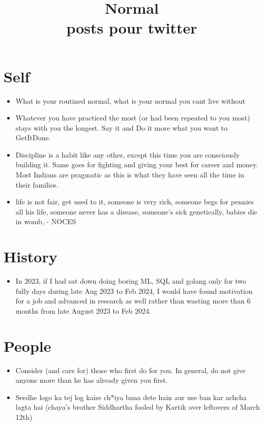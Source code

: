 \documentclass{article}
\title {\large {\textbf {Normal}} \\ \small {posts pour twitter}}
\begin{document}
\maketitle

\section {Self}
\begin{itemize}
\item What is your routined normal, what is your normal you cant live without
\item Whatever you have practiced the most (or had been repeated to you most) stays with you the longest. Say it and Do it more what you want to GetItDone.
\item Discipline is a habit like any other, except this time you are consciously building it. Same goes for fighting and giving your best for career and money. Most Indians are pragmatic as this is what they have seen all the time in their families.
\item life is not fair, get used to it, someone is very rich, someone begs for pennies all his life, someone never has a disease, someone's sick genetically, babies die in womb, - NOCES 

\end{itemize}

\section {History}
\begin{itemize}
\item In 2023, if I had sat down doing boring ML, SQL and golang only for two fully days during late Aug 2023 to Feb 2024, I would have found motivation for a job and advanced in research as well rather than wasting more than 6 months from late August 2023 to Feb 2024. 

\end{itemize}

\section{People}
\begin{itemize}
\item Consider (and care for) those who first do for you. In general, do not give anyone more than he has already given you first.
\item Seedhe logo ka tej log kaise ch*iya bana dete hain aur use ban kar achcha lagta hai (chaya's brother Siddhartha fooled by Kartik over leftovers of March 12th)

\end{itemize}

 
\end{document}
